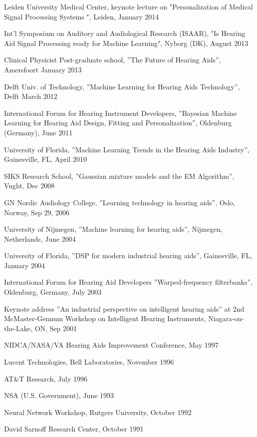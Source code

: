 \begin{items}
\item Leiden University Medical Center, keynote lecture on "Personalization of Medical Signal Processing Systems ", Leiden, January 2014 
\item Int'l Symposium on Auditory and Audiological Research (ISAAR), "Is Hearing Aid Signal Processing ready for Machine Learning", Nyborg (DK), August 2013
\item Clinical Physicist Post-graduate school, ''The Future of Hearing Aids'', Amersfoort January 2013
\item Delft Univ. of Technology, ''Machine Learning for Hearing Aids Technology'', Delft March 2012
\item International Forum for Hearing Instrument Developers, ''Bayesian Machine Learning for Hearing Aid Design, Fitting and Personalization'', Oldenburg (Germany), June 2011
\item University of Florida, ''Machine Learning Trends in the Hearing Aids Industry'', Gainesville, FL, April 2010 
\item SIKS Research School, ''Gaussian mixture models and the EM Algorithm'', Vught, Dec 2008
\item GN Nordic Audiology College, ''Learning technology in hearing aids'', Oslo, Norway, Sep 29, 2006
\item University of Nijmegen, ''Machine learning for hearing aids'', Nijmegen, Netherlands, June 2004
\item University of Florida, ''DSP for modern industrial hearing
aids'', Gainesville, FL, January 2004 
\item International Forum for Hearing Aid Developers ''Warped-frequency filterbanks'',
Oldenburg, Germany, July 2003 
\item Keynote address ''An
industrial perspective on intelligent hearing aids'' at 2nd
McMaster-Gennum Workshop on Intelligent Hearing Instruments, Niagara-on-the-Lake, ON, Sep 2001 
\item NIDCA/NASA/VA Hearing Aids Improvement Conference, May 1997 
\item Lucent Technologies, Bell Laboratories, November 1996 
\item AT\&T Research, July 1996 
\item NSA (U.S. Government), June 1993 
\item Neural Network Workshop, Rutgers University, October 1992 
\item David Sarnoff Research Center, October 1991
\end{items}


